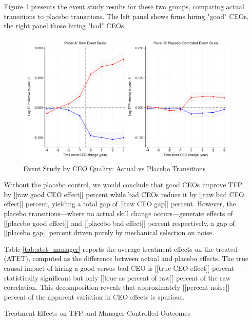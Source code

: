 \documentclass[11pt,a4paper]{article}
\begin{document}
Figure \ref{fig:event_study_split} presents the event study results for these two groups, comparing actual transitions to placebo transitions. The left panel shows firms hiring "good" CEOs, the right panel those hiring "bad" CEOs.

\begin{figure}[htbp]
\centering
\includegraphics[width=\textwidth]{figure/event_study.pdf}
\caption{Event Study by CEO Quality: Actual vs Placebo Transitions}
\label{fig:event_study_split}
\end{figure}

Without the placebo control, we would conclude that good CEOs improve TFP by [[raw good CEO effect]] percent while bad CEOs reduce it by [[raw bad CEO effect]] percent, yielding a total gap of [[raw CEO gap]] percent. However, the placebo transitions—where no actual skill change occurs—generate effects of [[placebo good effect]] and [[placebo bad effect]] percent respectively, a gap of [[placebo gap]] percent driven purely by mechanical selection on noise.

Table \ref{tab:atet_manager} reports the average treatment effects on the treated (ATET), computed as the difference between actual and placebo effects. The true causal impact of hiring a good versus bad CEO is [[true CEO effect]] percent—statistically significant but only [[true as percent of raw]] percent of the raw correlation. This decomposition reveals that approximately [[percent noise]] percent of the apparent variation in CEO effects is spurious.

\begin{table}[htbp]
\centering
\caption{Treatment Effects on TFP and Manager-Controlled Outcomes}
\label{tab:atet_manager}

\end{table}
\end{document}
